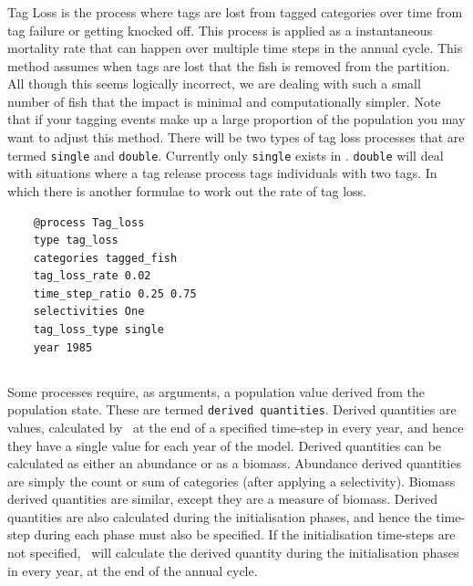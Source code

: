 \subsubsection{}

Tag Loss is the process where tags are lost from tagged categories over time from tag failure or getting knocked off. This process is applied as a instantaneous mortality rate that can happen over multiple time steps in the annual cycle. This method assumes when tags are lost that the fish is removed from the partition. All though this seems logically incorrect, we are dealing with such a small number of fish that the impact is minimal and computationally simpler. Note that if your tagging events make up a large proportion of the population you may want to adjust this method. There will be two types of tag loss processes that are termed \texttt{single} and \texttt{double}. Currently only \texttt{single} exists in \CNAME. \texttt{double} will deal with situations where a tag release process tags individuals with two tags. In which there is another formulae to work out the rate of tag loss.

{\small{\begin{verbatim}
	@process Tag_loss
	type tag_loss
	categories tagged_fish
	tag_loss_rate 0.02
	time_step_ratio 0.25 0.75
	selectivities One
	tag_loss_type single
	year 1985
		\end{verbatim}}}

\subsection{\label{sec:derived-quantities}}

Some processes require, as arguments, a population value derived from the population state. These are termed \texttt{derived quantities}. Derived quantities are values, calculated by \CNAME\ at the end of a specified time-step in every year, and hence they have a single value for each year of the model. Derived quantities can be calculated as either an abundance or as a biomass. Abundance derived quantities are simply the count or sum of categories (after applying a selectivity). Biomass derived quantities are similar, except they are a measure of biomass. Derived quantities are also calculated during the initialisation phases, and hence the time-step during each phase must also be specified. If the initialisation time-steps are not specified, \CNAME\ will calculate the derived quantity during the initialisation phases in every year, at the end of the annual cycle. 

